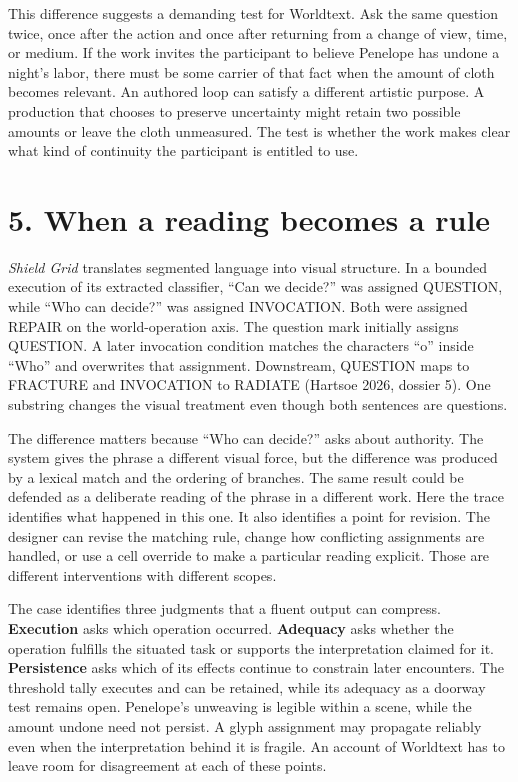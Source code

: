 \documentclass[
  11pt,
  letterpaper,
]{article}
\begin{document}
This difference suggests a demanding test for Worldtext. Ask the same
question twice, once after the action and once after returning from a
change of view, time, or medium. If the work invites the participant to
believe Penelope has undone a night's labor, there must be some carrier
of that fact when the amount of cloth becomes relevant. An authored loop
can satisfy a different artistic purpose. A production that chooses to
preserve uncertainty might retain two possible amounts or leave the
cloth unmeasured. The test is whether the work makes clear what kind of
continuity the participant is entitled to use.

\hypertarget{when-a-reading-becomes-a-rule}{%
\section{5. When a reading becomes a
rule}\label{when-a-reading-becomes-a-rule}}

\emph{Shield Grid} translates segmented language into visual structure.
In a bounded execution of its extracted classifier, ``Can we decide?''
was assigned QUESTION, while ``Who can decide?'' was assigned
INVOCATION. Both were assigned REPAIR on the world-operation axis. The
question mark initially assigns QUESTION. A later invocation condition
matches the characters ``o'' inside ``Who'' and overwrites that
assignment. Downstream, QUESTION maps to FRACTURE and INVOCATION to
RADIATE (Hartsoe 2026, dossier 5). One substring changes the visual
treatment even though both sentences are questions.

The difference matters because ``Who can decide?'' asks about authority.
The system gives the phrase a different visual force, but the difference
was produced by a lexical match and the ordering of branches. The same
result could be defended as a deliberate reading of the phrase in a
different work. Here the trace identifies what happened in this one. It
also identifies a point for revision. The designer can revise the
matching rule, change how conflicting assignments are handled, or use a
cell override to make a particular reading explicit. Those are different
interventions with different scopes.

The case identifies three judgments that a fluent output can compress.
\textbf{Execution} asks which operation occurred. \textbf{Adequacy} asks
whether the operation fulfills the situated task or supports the
interpretation claimed for it. \textbf{Persistence} asks which of its
effects continue to constrain later encounters. The threshold tally
executes and can be retained, while its adequacy as a doorway test
remains open. Penelope's unweaving is legible within a scene, while the
amount undone need not persist. A glyph assignment may propagate
reliably even when the interpretation behind it is fragile. An account
of Worldtext has to leave room for disagreement at each of these points.
\end{document}
